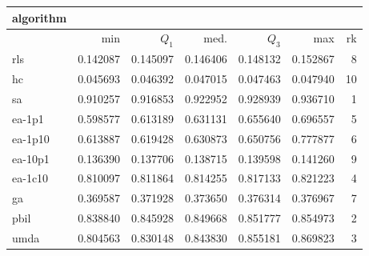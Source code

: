 \begin{tabular}{@{}l*{5}{>{{}}N{1}{3}}>{{}}N{2}{0}@{}}
\toprule
{algorithm} &  \\
\midrule
& {min} & {$Q_1$} & {med.} & {$Q_3$} & {max} & {rk}\\
\midrule
rls & 0.142087 & 0.145097 & 0.146406 & 0.148132 & 0.152867 & 8\\
hc & 0.045693 & 0.046392 & 0.047015 & 0.047463 & 0.047940 & 10\\
sa & {\color{blue}} 0.910257 & {\color{blue}} 0.916853 & {\color{blue}} 0.922952 & {\color{blue}} 0.928939 & {\color{blue}} 0.936710 & 1\\
ea-1p1 & 0.598577 & 0.613189 & 0.631131 & 0.655640 & 0.696557 & 5\\
ea-1p10 & 0.613887 & 0.619428 & 0.630873 & 0.650756 & 0.777877 & 6\\
ea-10p1 & 0.136390 & 0.137706 & 0.138715 & 0.139598 & 0.141260 & 9\\
ea-1c10 & 0.810097 & 0.811864 & 0.814255 & 0.817133 & 0.821223 & 4\\
ga & 0.369587 & 0.371928 & 0.373650 & 0.376314 & 0.376967 & 7\\
pbil & 0.838840 & 0.845928 & 0.849668 & 0.851777 & 0.854973 & 2\\
umda & 0.804563 & 0.830148 & 0.843830 & 0.855181 & 0.869823 & 3\\
\bottomrule
\end{tabular}
